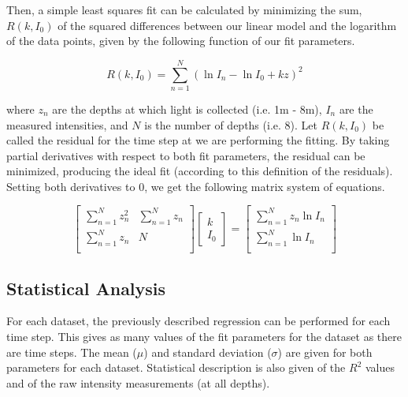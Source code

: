\documentclass{article}
\begin{document}
Then, a simple least squares fit can be calculated by minimizing the sum, $R(k,I_0)$ of the squared differences between our linear model and the logarithm of the data points, given by the following function of our fit parameters.

\begin{equation}
	R(k,I_0) = \sum_{n=1}^N (\ln I_n - \ln I_0 + kz)^2
	\label{resid}
\end{equation}

where $z_n$ are the depths at which light is collected (i.e. 1m - 8m), $I_n$ are the measured intensities, and $N$ is the number of depths (i.e. 8). Let $R(k,I_0)$ be called the residual for the time step at we are performing the fitting. By taking partial derivatives with respect to both fit parameters, the residual can be minimized, producing the ideal fit (according to this definition of the residuals). Setting both derivatives to 0, we get the following matrix system of equations.

\newcommand\xls{z_n}
\newcommand\yls{\ln I_n}
\begin{equation}
	\renewcommand\arraystretch{3}
	\begin{bmatrix}
		\sum_{n=1}^N \xls^2 & \sum_{n=1}^N \xls \\
		\sum_{n=1}^N \xls   & N \\
	\end{bmatrix}
%
	\begin{bmatrix}
		k \\
		I_0
	\end{bmatrix}
%
	=
%
	\begin{bmatrix}
		\sum_{n=1}^N \xls\yls \\
		\sum_{n=1}^N \yls \\
	\end{bmatrix}
	\label{lstsq}
\end{equation}

\subsection{Statistical Analysis}
\label{stats}
For each dataset, the previously described regression can be performed for each time step. This gives as many values of the fit parameters for the dataset as there are time steps. The mean ($\mu$) and standard deviation ($\sigma$) are given for both parameters for each dataset. Statistical description is also given of the $R^2$ values and of the raw intensity measurements (at all depths). \\
\end{document}
